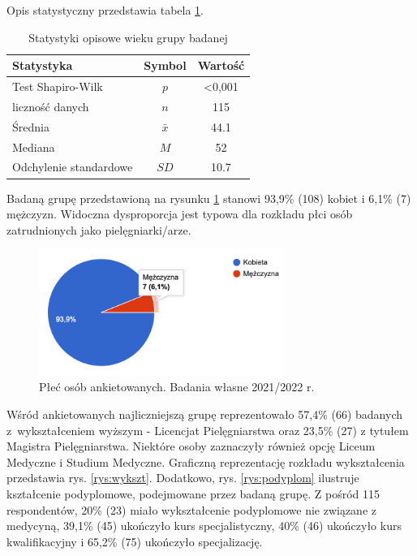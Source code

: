 \documentclass[a4paper,12pt,twoside,openright]{mwrep}
\begin{document}
Opis statystyczny przedstawia tabela \ref{tab:wiek}.

\begin {table}[H]
\caption{Statystyki opisowe wieku grupy badanej}
\centering
\begin{tabular}{|l|c|c|}
\hline
Statystyka & Symbol & Wartość\\
\hline
Test Shapiro-Wilk & $p$ & <0,001\\
\hline
liczność danych & $n$ & 115\\
\hline
Średnia & $\bar{x}$ & 44.1\\
\hline
Mediana & $M$ & 52\\
\hline
Odchylenie standardowe & $SD$ & 10.7\\
\hline

\end{tabular}
\label{tab:wiek}
\end{table}



Badaną grupę przedstawioną  na rysunku \ref{rys:plec} stanowi  93,9\%  (108) kobiet i  6,1\%  (7) mężczyzn. Widoczna dysproporcja jest typowa dla rozkładu płci osób zatrudnionych jako pielęgniarki/arze.

\begin{figure}[H]
\centering
\includegraphics[width=8cm]{char_gr_bad/plec00}
\caption{Płeć osób ankietowanych. Badania własne 2021/2022 r.}
\label{rys:plec}
\end{figure}



Wśród ankietowanych najliczniejszą grupę reprezentowało 57,4\% (66) badanych  z~wykształceniem wyższym - Licencjat Pielęgniarstwa oraz  23,5\%  (27) z tytułem Magistra Pielęgniarstwa. Niektóre osoby zaznaczyły również opcję Liceum Medyczne i  Studium Medyczne. Graficzną reprezentację rozkładu wykształcenia przedstawia rys. \ref{rys:wykszt}. Dodatkowo, rys. \ref{rys:podyplom} ilustruje kształcenie podyplomowe, podejmowane przez badaną grupę. Z pośród 115 respondentów, 20\% (23) miało wykształcenie podyplomowe nie związane z medycyną, 39,1\% (45) ukończyło kurs specjalistyczny, 40\% (46) ukończyło kurs kwalifikacyjny i 
65,2\% (75) ukończyło specjalizację.  
\end{document}
